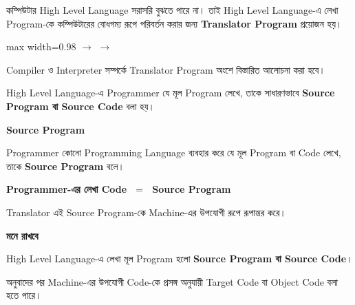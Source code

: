 
কম্পিউটার High Level Language সরাসরি বুঝতে পারে না।
তাই High Level Language-এ লেখা Program-কে কম্পিউটারের বোধগম্য
রূপে পরিবর্তন করার জন্য \textbf{Translator Program} প্রয়োজন হয়।

\begin{center}
\begin{adjustbox}{max width=0.98\linewidth}
\quad
\(\longrightarrow\)
\quad
{}
\quad
\(\longrightarrow\)
\quad
{}
\end{adjustbox}
\end{center}

Compiler ও Interpreter সম্পর্কে Translator Program অংশে
বিস্তারিত আলোচনা করা হবে।


High Level Language-এ Programmer যে মূল Program লেখে,
তাকে সাধারণভাবে \textbf{Source Program বা Source Code} বলা হয়।

\begin{definitionbox}

\textbf{\color{darkTeal}Source Program}

Programmer কোনো Programming Language ব্যবহার করে যে মূল
Program বা Code লেখে, তাকে \textbf{Source Program} বলে।

\end{definitionbox}

\begin{center}

\textbf{
Programmer-এর লেখা Code
\(\;=\;\)
Source Program
}

\end{center}

Translator এই Source Program-কে Machine-এর উপযোগী রূপে
রূপান্তর করে।

\begin{rememberbox}

\textbf{\color{deepOrange}মনে রাখবে}

High Level Language-এ লেখা মূল Program হলো
\textbf{Source Program বা Source Code}।

অনুবাদের পর Machine-এর উপযোগী Code-কে প্রসঙ্গ অনুযায়ী
Target Code বা Object Code বলা হতে পারে।

\end{rememberbox}

